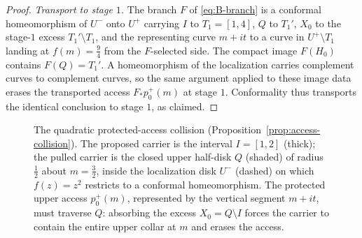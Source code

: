 \begin{proof}
\emph{Transport to stage $1$.}
The branch $F$ of \eqref{eq:B-branch} is a conformal homeomorphism of
$U^{-}$ onto $U^{+}$ carrying $I$ to $T_1=[1,4]$, $Q$ to $T_1'$, $X_0$ to the
stage-$1$ excess $T_1'\setminus T_1$, and the representing curve $m+it$ to a
curve in $U^{+}\setminus T_1$ landing at $f(m)=\tfrac94$ from the
$F$-selected side.  The compact image $F(H_0)$ contains
$F(Q)=T_1'$.  A homeomorphism of the localization carries complement
curves to complement curves, so the same argument applied to these image data
erases the transported access $F_{*}p_0^{+}(m)$ at stage $1$. Conformality
thus transports the identical conclusion to stage $1$, as claimed.
\end{proof}

\begin{figure}[ht]
\centering
{}
\caption{The quadratic protected-access collision
(Proposition~\ref{prop:access-collision}). The proposed carrier is the
interval $I=[1,2]$ (thick); the pulled carrier is the closed upper half-disk
$Q$ (shaded) of radius $\tfrac12$ about $m=\tfrac32$, inside the localization
disk $U^{-}$ (dashed) on which $f(z)=z^{2}$ restricts to a conformal
homeomorphism. The protected upper access $p_0^{+}(m)$, represented by the
vertical segment $m+it$, must traverse $Q$: absorbing the excess
$X_0=Q\setminus I$ forces the carrier to contain the entire upper collar at
$m$ and erases the access.}
\label{fig:access-collision}
\end{figure}


